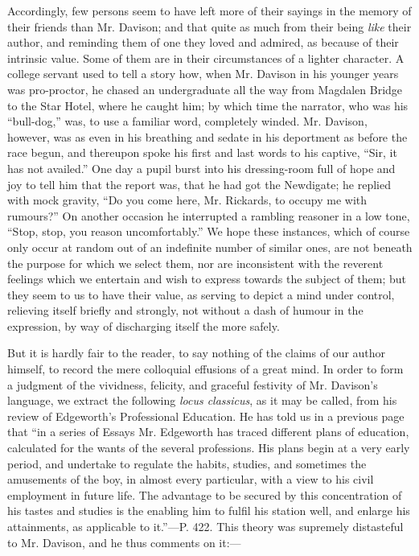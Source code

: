 Accordingly, few persons seem to have left more
of their sayings in the memory of their friends than Mr. Davison; and
that quite as much from their being \emph{like} their author, and
reminding them of one they loved and admired, as because of their
intrinsic value. Some of them are in their circumstances of a lighter
character. A college servant used to tell a story how, when Mr.
Davison in his younger years was pro-proctor, he chased an
undergraduate all the way from Magdalen Bridge to the Star Hotel,
where he caught him; by which time the narrator, who was his ``bull-dog,''
was, to use a familiar word, completely winded. Mr. Davison, however,
was as even in his breathing and sedate in his deportment as before
the race begun, and thereupon spoke his first and last words to his
captive, ``Sir, it has not availed.'' One day a pupil burst into his
dressing-room full of hope and joy to tell him that the report was,
that he had got the Newdigate; he replied with mock gravity, ``Do
you come here, Mr. Rickards, to occupy me with rumours?'' On
another occasion he interrupted a rambling reasoner in a low tone, ``Stop,
stop, you reason uncomfortably.'' We hope these instances, which of
course only occur at random out of an indefinite number of similar
ones, are not beneath the purpose for which we select them, nor are
inconsistent with the reverent feelings which we entertain and wish to
express towards the subject of them; but they seem to us to have their
value, as serving to depict a mind under control, relieving itself
briefly and strongly, not without a dash of humour in the expression,
by way of discharging itself the more safely.

But it is hardly fair to the reader, to say
nothing of the claims of our author himself, to record the mere
colloquial effusions of a great mind. In order to form a judgment of
the vividness, felicity, and graceful festivity of Mr. Davison's
language, we extract the following \emph{locus classicus}, as it may
be called, from his review of Edgeworth's Professional Education. He
has told us in a previous page that ``in a series of Essays Mr.
Edgeworth has traced different plans of education, calculated for the
wants of the several professions. His plans begin at a very early
period, and undertake to regulate the habits, studies, and sometimes
the amusements of the boy, in almost every particular, with a view to
his civil employment in future life. The advantage to be secured by
this concentration of his tastes and studies is the enabling him to
fulfil his station well, and enlarge his attainments, as applicable to
it.''—P. 422. This theory was supremely distasteful to Mr. Davison,
and he thus comments on it:—

